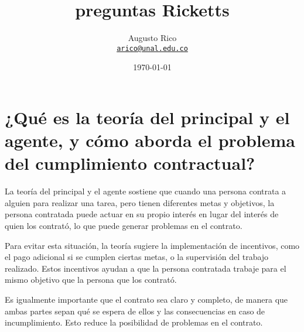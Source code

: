 \documentclass[11pt]{article}
\title{preguntas Ricketts
}
\author{Augusto Rico\\
    \href{mailto:arico@unal.edu.co}{\texttt{arico@unal.edu.co}}}
\date{\today}
\begin{document}
\maketitle



\section{ ¿Qué es la teoría del principal y el agente, y cómo aborda el problema del cumplimiento contractual?}
\begin{flushleft}
    La teoría del principal y el agente sostiene que cuando una persona contrata a alguien para realizar una tarea, pero tienen diferentes metas y objetivos, la persona contratada puede actuar en su propio interés en lugar del interés de quien los contrató, lo que puede generar problemas en el contrato.

    Para evitar esta situación, la teoría sugiere la implementación de incentivos, como el pago adicional si se cumplen ciertas metas, o la supervisión del trabajo realizado. Estos incentivos ayudan a que la persona contratada trabaje para el mismo objetivo que la persona que los contrató.

    Es igualmente importante que el contrato sea claro y completo, de manera que ambas partes sepan qué se espera de ellos y las consecuencias en caso de incumplimiento. Esto reduce la posibilidad de problemas en el contrato.
\end{flushleft}
\end{document}
